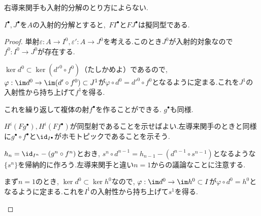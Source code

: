 右導来関手も入射的分解のとり方によらない.

\begin{prop}\label{prop:右導来関手のwell-definedness}
	$I^\bullet,J^\bullet$を$A$の入射的分解とすると,~$F I^\bullet$と$F J^\bullet$は擬同型である.
\end{prop}
\begin{proof}
	単射$\varepsilon:A\to I^0,\varepsilon':A\to J^0$を考える.このとき$J^0$が入射的対象なので$f^0:I^0\to J^0$が存在する.
	\begin{figure}[H]
		\centering
		\caption{}
	\end{figure}

	$\ker d^0\subset\ker(d'^0\circ f^0)$（たしかめよ）であるので, $\varphi:\im d^0\to \im (d'\circ f^0)\subset J^1$が$\varphi\circ d^0=d'^0\circ f^0$となるように定まる.これを$J^1$の入射性から持ち上げて$f^1$を得る.
	
	\begin{figure}[H]
		\centering
		\caption{}
	\end{figure}
	
	これを繰り返して複体の射$f^\bullet$を作ることができる. $g^\bullet$も同様.
	
	$H^i(Fg^\bullet),H^i(Ff^\bullet)$が同型射であることを示せばよい.左導来関手のときと同様に$g^\bullet\circ f^\bullet$と$\id_{I^\bullet}$がホモトピックであることを示そう.
	
	$h_n=\id_{I^n}-(g^n\circ f^n)$とおき, $s^n\circ d^{n-1}=h_{n-1}-(d^{n-1}\circ s^{n-1})$となるような$\{s^n\}$を帰納的に作ろう.左導来関手と違い$n=1$からの議論なことに注意する.
	
	まず$n=1$のとき, $\ker d^0\subset\ker h^0$なので, $\varphi:\im d^0\to\im h^0\subset I$が$\varphi\circ d^0=h^0$となるように定まる.これを$I^1$の入射性から持ち上げて$s^1$を得る.
	
	\begin{figure}[H]
		\centering
		\caption{}
	\end{figure}
	

\end{proof}
